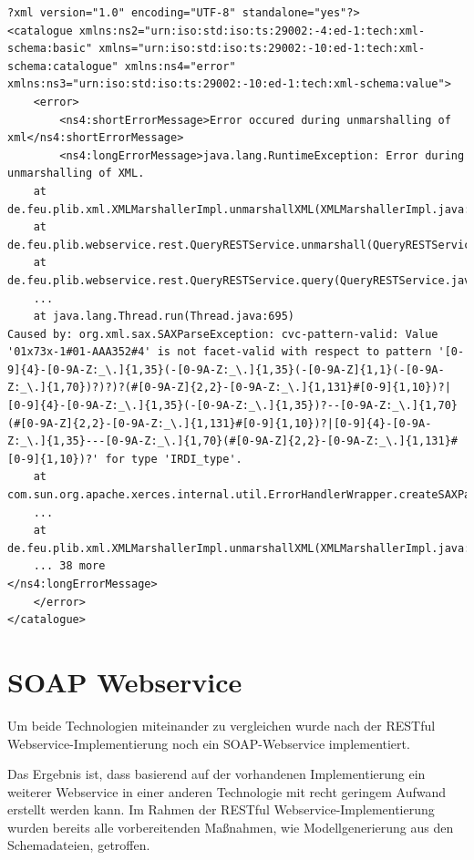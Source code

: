  \begin{lstlisting}[caption=Fehlerbehandlung - Beispielantwort mit Validierungsfehler=xml, label=lst:error_catalogue_beispiel]
?xml version="1.0" encoding="UTF-8" standalone="yes"?>
<catalogue xmlns:ns2="urn:iso:std:iso:ts:29002:-4:ed-1:tech:xml-schema:basic" xmlns="urn:iso:std:iso:ts:29002:-10:ed-1:tech:xml-schema:catalogue" xmlns:ns4="error" xmlns:ns3="urn:iso:std:iso:ts:29002:-10:ed-1:tech:xml-schema:value">
    <error>
        <ns4:shortErrorMessage>Error occured during unmarshalling of xml</ns4:shortErrorMessage>
        <ns4:longErrorMessage>java.lang.RuntimeException: Error during unmarshalling of XML.
	at de.feu.plib.xml.XMLMarshallerImpl.unmarshallXML(XMLMarshallerImpl.java:63)
	at de.feu.plib.webservice.rest.QueryRESTService.unmarshall(QueryRESTService.java:151)
	at de.feu.plib.webservice.rest.QueryRESTService.query(QueryRESTService.java:91)
	...
	at java.lang.Thread.run(Thread.java:695)
Caused by: org.xml.sax.SAXParseException: cvc-pattern-valid: Value '01x73x-1#01-AAA352#4' is not facet-valid with respect to pattern '[0-9]{4}-[0-9A-Z:_\.]{1,35}(-[0-9A-Z:_\.]{1,35}(-[0-9A-Z]{1,1}(-[0-9A-Z:_\.]{1,70})?)?)?(#[0-9A-Z]{2,2}-[0-9A-Z:_\.]{1,131}#[0-9]{1,10})?|[0-9]{4}-[0-9A-Z:_\.]{1,35}(-[0-9A-Z:_\.]{1,35})?--[0-9A-Z:_\.]{1,70}(#[0-9A-Z]{2,2}-[0-9A-Z:_\.]{1,131}#[0-9]{1,10})?|[0-9]{4}-[0-9A-Z:_\.]{1,35}---[0-9A-Z:_\.]{1,70}(#[0-9A-Z]{2,2}-[0-9A-Z:_\.]{1,131}#[0-9]{1,10})?' for type 'IRDI_type'.
	at com.sun.org.apache.xerces.internal.util.ErrorHandlerWrapper.createSAXParseException(ErrorHandlerWrapper.java:195)
	...
	at de.feu.plib.xml.XMLMarshallerImpl.unmarshallXML(XMLMarshallerImpl.java:57)
	... 38 more
</ns4:longErrorMessage>
    </error>
</catalogue>
\end{lstlisting} 

\section{SOAP Webservice}

Um beide Technologien miteinander zu vergleichen wurde nach der \gls{REST}ful \gls{Webservice}-Implementierung noch ein \gls{SOAP}-\gls{Webservice} implementiert. 

Das Ergebnis ist, dass basierend auf der vorhandenen Implementierung ein weiterer Webservice in einer anderen Technologie mit recht geringem Aufwand erstellt werden kann. Im Rahmen der \gls{REST}ful \gls{Webservice}-Implementierung wurden bereits alle vorbereitenden Maßnahmen, wie Modellgenerierung aus den Schemadateien, getroffen. 
 
